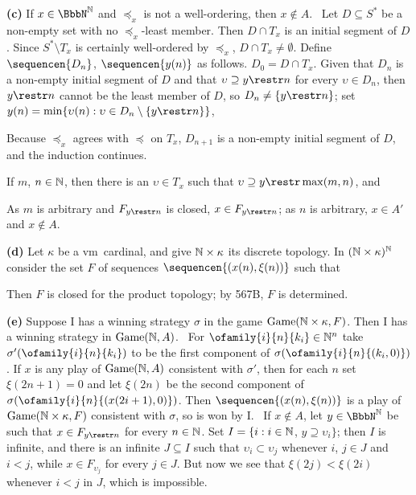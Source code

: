 {\medskip

{\bf (c)} If $x\in\NN$ and $\preccurlyeq_x$ is not a well-ordering, then
$x\notin A$.   \Prf\ Let $D\subseteq S^*$ be a non-empty set with no
$\preccurlyeq_x$-least member.   Then $D\cap T_x$ is an initial segment of
$D$.   Since $S^*\setminus T_x$ is certainly
well-ordered by $\preccurlyeq_x$, $D\cap T_x\ne\emptyset$.
Define $\sequencen{D_n}$, $\sequencen{y(n)}$ as follows.   $D_0=D\cap T_x$.
Given that $D_n$ is a non-empty
initial segment of $D$ and that $\upsilon\supseteq y\restr n$ for every
$\upsilon\in D_n$, then $y\restr n$ cannot be the least member of $D$, so
$D_n\ne\{y\restr n\}$;  set
$y(n)=\min\{\upsilon(n):\upsilon\in D_n\setminus\{y\restr n\}\}$,


\noindent Because
$\preccurlyeq_x$ agrees with $\preccurlyeq$ on $T_x$, $D_{n+1}$ is a
non-empty initial segment of $D$, and the induction continues.

If $m$, $n\in\Bbb N$, then there is an $\upsilon\in T_x$ such that
$\upsilon\supseteq y\restr\max(m,n)$, and


\noindent As $m$ is arbitrary and
$F_{y\restr n}$ is closed, $x\in F_{y\restr n}$;  as
$n$ is arbitrary, $x\in A'$ and $x\notin A$.\ \Qed

\medskip

{\bf (d)} Let $\kappa$ be a \2vm\ cardinal, and give $\Bbb N\times\kappa$
its discrete topology.
In $(\Bbb N\times\kappa)^{\Bbb N}$ consider the set
$F$ of sequences $\sequencen{(x(n),\xi(n))}$ such that


\noindent Then $F$ is closed
for the product topology;  by 567B, $F$ is determined.

\medskip

{\bf (e)} Suppose I has a winning strategy $\sigma$ in the game
$\Game(\Bbb N\times\kappa,F)$.
Then I has a winning strategy in $\Game(\Bbb N,A)$.   \Prf\ For
$\ofamily{i}{n}{k_i}\in\Bbb N^n$ take
$\sigma'(\ofamily{i}{n}{k_i})$ to be the first component of
$\sigma(\ofamily{i}{n}{(k_i,0)})$.   If $x$ is any play of
$\Game(\Bbb N,A)$ consistent with $\sigma'$, then for each $n$ set
$\xi(2n+1)=0$ and let $\xi(2n)$ be the second component of
$\sigma(\ofamily{i}{n}{(x(2i+1),0)})$.   Then
$\sequencen{(x(n),\xi(n))}$ is a play of $\Game(\Bbb N\times\kappa,F)$
consistent with $\sigma$, so is won by I.   \Quer\ If $x\notin A$,
let $y\in\NN$ be such that $x\in F_{y\restr n}$ for every $n\in\Bbb N$.
Set $I=\{i:i\in\Bbb N$, $y\supseteq\upsilon_i\}$;  then $I$ is infinite,
and there is an infinite $J\subseteq I$ such that
$\upsilon_i\subset\upsilon_j$ whenever $i$, $j\in J$ and $i<j$, while
$x\in F_{\upsilon_j}$ for every $j\in J$.
But now we see that $\xi(2j)<\xi(2i)$ whenever $i<j$ in
$J$, which is impossible.\ \Bang

}
